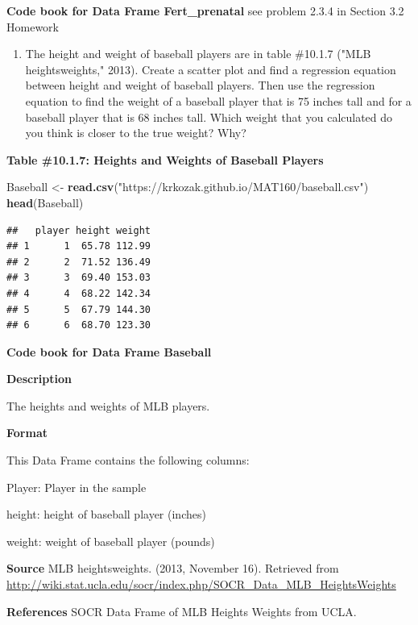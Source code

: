 \documentclass[]{book}
\newenvironment{Shaded}{\begin{snugshade}}{\end{snugshade}}
\newcommand{\KeywordTok}[1]{\textcolor[rgb]{0.13,0.29,0.53}{\textbf{#1}}}
\newcommand{\NormalTok}[1]{#1}
\newcommand{\StringTok}[1]{\textcolor[rgb]{0.31,0.60,0.02}{#1}}
\providecommand{\tightlist}{%
  \setlength{\itemsep}{0pt}\setlength{\parskip}{0pt}}
\begin{document}
\textbf{Code book for Data Frame Fert\_prenatal} see problem 2.3.4 in Section 3.2 Homework

\begin{enumerate}
\def\labelenumi{\arabic{enumi}.}
\setcounter{enumi}{4}
\tightlist
\item
  The height and weight of baseball players are in table \#10.1.7 ("MLB heightsweights," 2013). Create a scatter plot and find a regression equation between height and weight of baseball players. Then use the regression equation to find the weight of a baseball player that is 75 inches tall and for a baseball player that is 68 inches tall. Which weight that you calculated do you think is closer to the true weight? Why?
\end{enumerate}

\textbf{Table \#10.1.7: Heights and Weights of Baseball Players}

\begin{Shaded}
\begin{Highlighting}[]
\NormalTok{Baseball <-}\StringTok{ }\KeywordTok{read.csv}\NormalTok{(}\StringTok{"https://krkozak.github.io/MAT160/baseball.csv"}\NormalTok{)}
\KeywordTok{head}\NormalTok{(Baseball)}
\end{Highlighting}
\end{Shaded}

\begin{verbatim}
##   player height weight
## 1      1  65.78 112.99
## 2      2  71.52 136.49
## 3      3  69.40 153.03
## 4      4  68.22 142.34
## 5      5  67.79 144.30
## 6      6  68.70 123.30
\end{verbatim}

\textbf{Code book for Data Frame Baseball}

\textbf{Description}

The heights and weights of MLB players.

\textbf{Format}

This Data Frame contains the following columns:

Player: Player in the sample

height: height of baseball player (inches)

weight: weight of baseball player (pounds)

\textbf{Source}
MLB heightsweights. (2013, November 16). Retrieved from
\url{http://wiki.stat.ucla.edu/socr/index.php/SOCR_Data_MLB_HeightsWeights}

\textbf{References}
SOCR Data Frame of MLB Heights Weights from UCLA.
\end{document}
